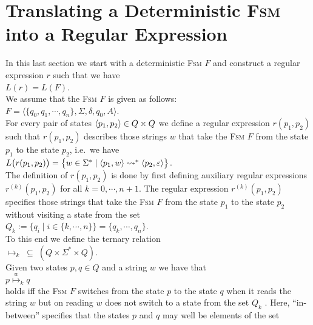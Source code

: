 \section{Translating a Deterministic \textsc{Fsm} into a Regular Expression}
In this last section we start with a deterministic \textsc{Fsm} $F$ and construct a regular expression $r$
such that we have
\\[0.2cm]
\hspace*{1.3cm}
$L(r) = L(F)$. 
\\[0.2cm]
We assume that the \textsc{Fsm} $F$ is given as follows:
\\[0.2cm]
\hspace*{1.3cm}
$F = \bigl\langle \{ q_0, q_1, \cdots, q_n \}, \Sigma, \delta, q_0, A \bigr\rangle$.
\\[0.2cm]
For every pair of states $\pair(p_1,p_2) \in Q \times Q$ we define a regular expression
$r(p_1, p_2)$ such that $r(p_1, p_2)$ describes those strings $w$ that take the \textsc{Fsm} $F$ from the state
$p_1$ to the state $p_2$, i.e.~we have
\\[0.2cm]
\hspace*{1.3cm}
$L\bigl(r(p_1, p_2)\bigr) = 
  \bigl\{ w \in \Sigma^* \mid \pair(p_1,w) \leadsto^* \pair(p_2, \varepsilon) \bigr\}$.
\\[0.2cm]  
The definition of $r(p_1, p_2)$ is done by first defining auxiliary regular expressions 
$r^{(k)}(p_1, p_2)$ for all $k =0,\cdots,n+1$.   The regular expression $r^{(k)}(p_1, p_2)$ specifies those
strings that take the \textsc{Fsm} $F$ from the state
$p_1$ to the state $p_2$ without visiting a state from the set
\\[0.2cm]
\hspace*{1.3cm}
$Q_k := \bigl\{ q_i \mid i \in \{k,\cdots,n \}  \bigl\} = \{ q_k, \cdots, q_n \}$.
\\[0.2cm]
To this end we define the ternary relation
\\[0.2cm]
\hspace*{1.3cm}
$\mapsto_k \;\subseteq\; (Q \times \Sigma^* \times Q)$.
\\[0.2cm]
Given two states $p, q \in Q$ and a string $w$ we have that
\\[0.2cm]
\hspace*{1.3cm}
$p \stackrel{w}{\mapsto}_k q$
\\[0.2cm]
holds iff the \textsc{Fsm} $F$ switches from the state $p$ to the state $q$ when it reads the string $w$
but on reading $w$ does not switch to a state from the set
$Q_k$ .  Here, ``in-between'' specifies that the states $p$ and $q$ may well be elements of the set
